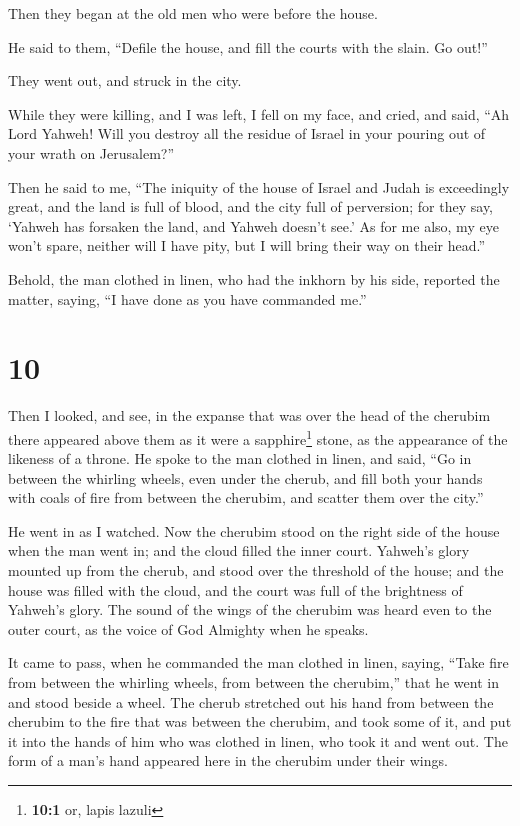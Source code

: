 Then they began at the old men who were before the house.

 He said to them, ``Defile the house, and fill the courts
with the slain. Go out!''

They went out, and struck in the city.

 While they were killing, and I was left, I fell on my
face, and cried, and said, ``Ah Lord Yahweh! Will you destroy all the
residue of Israel in your pouring out of your wrath on Jerusalem?''

 Then he said to me, ``The iniquity of the house of Israel
and Judah is exceedingly great, and the land is full of blood, and the
city full of perversion; for they say, `Yahweh has forsaken the land,
and Yahweh doesn't see.'  As for me also, my eye won't
spare, neither will I have pity, but I will bring their way on their
head.''

 Behold, the man clothed in linen, who had the inkhorn by
his side, reported the matter, saying, ``I have done as you have
commanded me.''

\hypertarget{section-9}{%
\section{10}\label{section-9}}

 Then I looked, and see, in the expanse that was over the
head of the cherubim there appeared above them as it were a
sapphire\footnote{\textbf{10:1} or, lapis lazuli} stone, as the
appearance of the likeness of a throne.  He spoke to the
man clothed in linen, and said, ``Go in between the whirling wheels,
even under the cherub, and fill both your hands with coals of fire from
between the cherubim, and scatter them over the city.''

He went in as I watched.  Now the cherubim stood on the
right side of the house when the man went in; and the cloud filled the
inner court.  Yahweh's glory mounted up from the cherub,
and stood over the threshold of the house; and the house was filled with
the cloud, and the court was full of the brightness of Yahweh's glory.
 The sound of the wings of the cherubim was heard even to
the outer court, as the voice of God Almighty when he speaks.

 It came to pass, when he commanded the man clothed in
linen, saying, ``Take fire from between the whirling wheels, from
between the cherubim,'' that he went in and stood beside a wheel.
 The cherub stretched out his hand from between the
cherubim to the fire that was between the cherubim, and took some of it,
and put it into the hands of him who was clothed in linen, who took it
and went out.  The form of a man's hand appeared here in
the cherubim under their wings.

